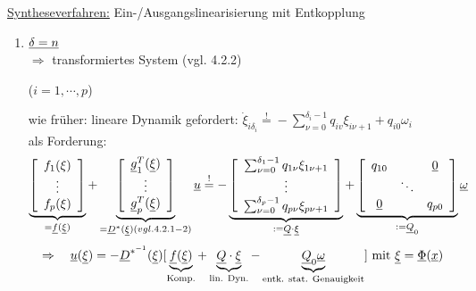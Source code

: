 \documentclass[openany,a4paper,11pt]{book}
\begin{document}
\uline{Syntheseverfahren:} Ein-/Ausgangslinearisierung mit Entkopplung \begin{enumerate}
    \item $\uline{\delta=n}$ \\
    $\Rightarrow$ transformiertes System (vgl. 4.2.2)\\
    \begin{minipage}[c]{\textwidth}
           ($i=1,\cdots,p$)
    \end{minipage}
    wie früher: lineare Dynamik gefordert: $\dot{\xi}_{i\delta_i}\stackrel{!}{=}-\sum_{\nu=0}^{\delta_i-1}q_{iv}\xi_{i\nu+1}+q_{i0}\omega_i$\\
    als Forderung:
    \[\underbrace{\left[ \begin{array}{c} 
    f_1(\xi)\\ \vdots\\ f_p(\xi)\\ \end{array} \right]}_{=\uline{f}(\uline{\xi})} +
    \underbrace{\left[ \begin{array}{c} 
    \uline{g}_1^T(\uline{\xi})\\ \vdots\\ \uline{g}_p^T(\uline{\xi})\\ \end{array} \right]}_{=\uline{D}^*(\uline{\xi}) (vgl. 4.2.1-2)} \uline{u}
    \stackrel{!}{=}-
    \underbrace{\left[ \begin{array}{c}      \sum_{\nu=0}^{\delta_1-1}q_{1\nu}\xi_{1\nu+1}\\ \vdots\\ \sum_{\nu=0}^{\delta_p-1}q_{p\nu}\xi_{p\nu+1}\\ \end{array} \right]}_{:=\uline{Q}\cdot \uline{\xi}}+
    \underbrace{\left[ \begin{array}{ccc} 
    q_{10}& &\uline{0}\\ &\ddots &\\ \uline{0}& &q_{p0}\\ \end{array} \right]}_{:=\uline{Q}_0}\uline{\omega}\]
    \[\Rightarrow \quad \uline{u}(\uline{\xi})=-\uline{D}^{*^{-1}}(\uline{\xi})[\underbrace{\uline{f}(\uline{\xi})}_{\text{Komp.}}+\underbrace{\uline{Q}\cdot\uline{\xi}}_{\text{lin. Dyn.}}-\underbrace{\uline{Q}_0\uline{\omega}}_{\text{entk. stat. Genauigkeit}}]  \text{ mit } \uline{\xi}=\uline{\Phi}(\uline{x})\]

\end{enumerate}
\end{document}
